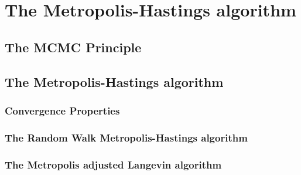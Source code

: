 \section{The Metropolis-Hastings algorithm}
\label{sec:Metropolis-HastingsAlgo}

\subsection{The MCMC Principle}

\subsection{The Metropolis-Hastings algorithm}

\subsubsection{Convergence Properties}

\subsubsection{The Random Walk Metropolis-Hastings algorithm}

\subsubsection{The Metropolis adjusted Langevin algorithm}